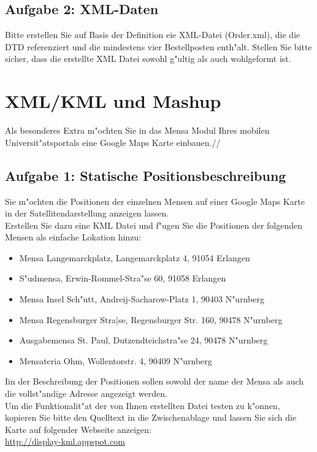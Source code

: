 \subsection{Aufgabe 2: XML-Daten}
Bitte erstellen Sie auf Basis der Definition eie XML-Datei (Order.xml), die die DTD referenziert und die mindestens vier Bestellposten enth"alt.
Stellen Sie bitte sicher, dass die erstellte XML Datei sowohl g"ultig als auch wohlgeformt ist.\\



\section{XML/KML und Mashup}
Als besonderes Extra m"ochten Sie in das Mensa Modul Ihres mobilen Universit"atsportals eine Google Maps Karte einbauen.//

\subsection{Aufgabe 1: Statische Positionsbeschreibung}
Sie m"ochten die Positionen der einzelnen Mensen auf einer Google Maps Karte in der Satellitendarstellung anzeigen lassen.\\
Erstellen Sie dazu eine KML Datei und f"ugen Sie die Positionen der folgenden Mensen als einfache Lokation hinzu:
\begin{itemize}
    \item Mensa Langemarckplatz, Langemarckplatz 4, 91054 Erlangen
    \item S"udmensa, Erwin-Rommel-Stra"se 60, 91058 Erlangen
    \item Mensa Insel Sch"utt, Andreij-Sacharow-Platz 1, 90403 N"urnberg
    \item Mensa Regensburger Stra|se, Regensburger Str. 160, 90478 N"urnberg
    \item Ausgabemensa St. Paul, Dutzendteichstra"se 24, 90478 N"urnberg
    \item Mensateria Ohm, Wollentorstr. 4, 90409 N"urnberg
\end{itemize}
Iin der Beschreibung der Positionen sollen sowohl der name der Mensa als auch die vollst"andige Adresse angezeigt werden.\\
Um die Funktionalit"at der von Ihnen erstellten Datei testen zu k"onnen, kopieren Sie bitte den Quelltext in die Zwischenablage und lassen Sie sich die Karte auf folgender Webseite anzeigen:\\
\url{http://display-kml.appspot.com}

